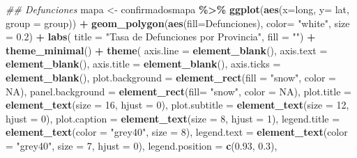 \documentclass[
]{book}
\newenvironment{Shaded}{\begin{snugshade}}{\end{snugshade}}
\newcommand{\CommentTok}[1]{\textcolor[rgb]{0.56,0.35,0.01}{\textit{#1}}}
\newcommand{\DataTypeTok}[1]{\textcolor[rgb]{0.13,0.29,0.53}{#1}}
\newcommand{\DecValTok}[1]{\textcolor[rgb]{0.00,0.00,0.81}{#1}}
\newcommand{\FloatTok}[1]{\textcolor[rgb]{0.00,0.00,0.81}{#1}}
\newcommand{\KeywordTok}[1]{\textcolor[rgb]{0.13,0.29,0.53}{\textbf{#1}}}
\newcommand{\NormalTok}[1]{#1}
\newcommand{\OperatorTok}[1]{\textcolor[rgb]{0.81,0.36,0.00}{\textbf{#1}}}
\newcommand{\OtherTok}[1]{\textcolor[rgb]{0.56,0.35,0.01}{#1}}
\newcommand{\StringTok}[1]{\textcolor[rgb]{0.31,0.60,0.02}{#1}}
\begin{document}
\begin{Shaded}
\begin{Highlighting}[]
\CommentTok{\#\# Defunciones}
\NormalTok{mapa \textless{}{-}}\StringTok{ }\NormalTok{confirmadosmapa }\OperatorTok{\%\textgreater{}\%}
\StringTok{  }\KeywordTok{ggplot}\NormalTok{(}\KeywordTok{aes}\NormalTok{(}\DataTypeTok{x=}\NormalTok{long, }\DataTypeTok{y=}\NormalTok{ lat, }\DataTypeTok{group =}\NormalTok{ group)) }\OperatorTok{+}
\StringTok{  }\KeywordTok{geom\_polygon}\NormalTok{(}\KeywordTok{aes}\NormalTok{(}\DataTypeTok{fill=}\NormalTok{Defunciones), }\DataTypeTok{color=} \StringTok{"white"}\NormalTok{, }\DataTypeTok{size =} \FloatTok{0.2}\NormalTok{) }\OperatorTok{+}
\StringTok{  }\KeywordTok{labs}\NormalTok{( }\DataTypeTok{title =} \StringTok{"Tasa de Defunciones por Provincia"}\NormalTok{,}
        \DataTypeTok{fill =} \StringTok{""}\NormalTok{) }\OperatorTok{+}
\StringTok{  }\KeywordTok{theme\_minimal}\NormalTok{() }\OperatorTok{+}
\StringTok{  }\KeywordTok{theme}\NormalTok{(}
    \DataTypeTok{axis.line =} \KeywordTok{element\_blank}\NormalTok{(),}
    \DataTypeTok{axis.text =} \KeywordTok{element\_blank}\NormalTok{(),}
    \DataTypeTok{axis.title =} \KeywordTok{element\_blank}\NormalTok{(),}
    \DataTypeTok{axis.ticks =} \KeywordTok{element\_blank}\NormalTok{(),}
    \DataTypeTok{plot.background =} \KeywordTok{element\_rect}\NormalTok{(}\DataTypeTok{fill =} \StringTok{"snow"}\NormalTok{, }\DataTypeTok{color =} \OtherTok{NA}\NormalTok{),}
    \DataTypeTok{panel.background =} \KeywordTok{element\_rect}\NormalTok{(}\DataTypeTok{fill=} \StringTok{"snow"}\NormalTok{, }\DataTypeTok{color =} \OtherTok{NA}\NormalTok{),}
    \DataTypeTok{plot.title =} \KeywordTok{element\_text}\NormalTok{(}\DataTypeTok{size =} \DecValTok{16}\NormalTok{, }\DataTypeTok{hjust =} \DecValTok{0}\NormalTok{),}
    \DataTypeTok{plot.subtitle =} \KeywordTok{element\_text}\NormalTok{(}\DataTypeTok{size =} \DecValTok{12}\NormalTok{, }\DataTypeTok{hjust =} \DecValTok{0}\NormalTok{),}
    \DataTypeTok{plot.caption =} \KeywordTok{element\_text}\NormalTok{(}\DataTypeTok{size =} \DecValTok{8}\NormalTok{, }\DataTypeTok{hjust =} \DecValTok{1}\NormalTok{),}
    \DataTypeTok{legend.title =} \KeywordTok{element\_text}\NormalTok{(}\DataTypeTok{color =} \StringTok{"grey40"}\NormalTok{, }\DataTypeTok{size =} \DecValTok{8}\NormalTok{),}
    \DataTypeTok{legend.text =} \KeywordTok{element\_text}\NormalTok{(}\DataTypeTok{color =} \StringTok{"grey40"}\NormalTok{, }\DataTypeTok{size =} \DecValTok{7}\NormalTok{, }\DataTypeTok{hjust =} \DecValTok{0}\NormalTok{),}
    \DataTypeTok{legend.position =} \KeywordTok{c}\NormalTok{(}\FloatTok{0.93}\NormalTok{, }\FloatTok{0.3}\NormalTok{),}

\end{Highlighting}
\end{Shaded}
\end{document}
